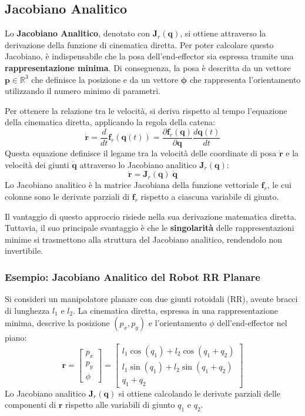 ﻿\documentclass[11pt, a4paper]{article}
\begin{document}
\subsection{Jacobiano Analitico}
Lo \textbf{Jacobiano Analitico}, denotato con \(\bm{J}_r(\bm{q})\), si ottiene attraverso la derivazione della funzione di cinematica diretta. Per poter calcolare questo Jacobiano, è indispensabile che la posa dell'end-effector sia espressa tramite una \textbf{rappresentazione minima}. Di conseguenza, la posa è descritta da un vettore \(\bm{p} \in \mathbb{R}^3\) che definisce la posizione e da un vettore \(\bm{\phi}\) che rappresenta l'orientamento utilizzando il numero minimo di parametri.

Per ottenere la relazione tra le velocità, si deriva rispetto al tempo l'equazione della cinematica diretta, applicando la regola della catena:
\[
    \dot{\bm{r}} = \frac{d}{dt}\bm{f}_r(\bm{q}(t)) = \frac{\partial \bm{f}_r(\bm{q})}{\partial \bm{q}} \frac{d\bm{q}(t)}{dt}
\]
Questa equazione definisce il legame tra la velocità delle coordinate di posa \(\dot{\bm{r}}\) e la velocità dei giunti \(\dot{\bm{q}}\) attraverso lo Jacobiano analitico \(\bm{J}_r(\bm{q})\):
\[
    \dot{\bm{r}} = \bm{J}_r(\bm{q}) \; \dot{\bm{q}}
\]
Lo Jacobiano analitico è la matrice Jacobiana della funzione vettoriale \(\bm{f}_r\), le cui colonne sono le derivate parziali di \(\bm{f}_r\) rispetto a ciascuna variabile di giunto.

Il vantaggio di questo approccio risiede nella sua derivazione matematica diretta. Tuttavia, il suo principale svantaggio è che le \textbf{singolarità} delle rappresentazioni minime si trasmettono alla struttura del Jacobiano analitico, rendendolo non invertibile.

\subsubsection{Esempio: Jacobiano Analitico del Robot RR Planare}
Si consideri un manipolatore planare con due giunti rotoidali (RR), avente bracci di lunghezza \(l_1\) e \(l_2\). La cinematica diretta, espressa in una rappresentazione minima, descrive la posizione \((p_x, p_y)\) e l'orientamento \(\phi\) dell'end-effector nel piano:
\[
    \bm{r} = \begin{bmatrix} p_x \\ p_y \\ \phi \end{bmatrix} =
    \begin{bmatrix}
        l_1 \cos(q_1) + l_2 \cos(q_1 + q_2) \\
        l_1 \sin(q_1) + l_2 \sin(q_1 + q_2) \\
        q_1 + q_2
    \end{bmatrix}
\]
Lo Jacobiano analitico \(\bm{J}_r(\bm{q})\) si ottiene calcolando le derivate parziali delle componenti di \(\bm{r}\) rispetto alle variabili di giunto \(q_1\) e \(q_2\).
\end{document}
